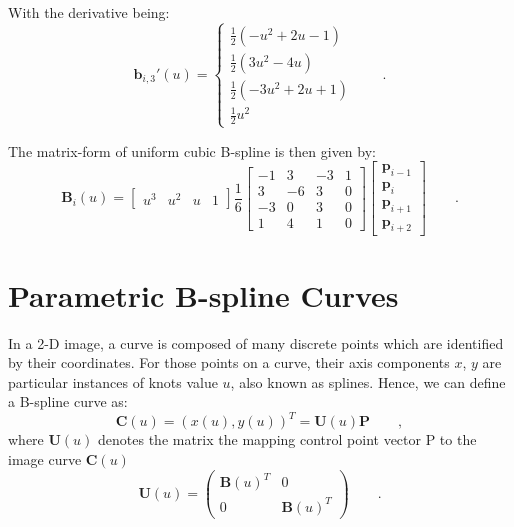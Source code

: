 With the derivative being: 
\begin{equation}
  \label{eq:4.7}
  \mathbf{b}_{i,3}'(u) = \begin{cases} \frac{1}{2}(-u^2+2u-1) \\
    \frac{1}{2}(3u^2 -4u)\\ \frac{1}{2}(-3u^2+2u+1) \\
    \frac{1}{2}u^2
   \end{cases}\qquad .
\end{equation}


The matrix-form of uniform cubic B-spline is then given by:
\begin{equation}
  \label{eq:4.8}
\mathbf{B}_i(u) = \begin{bmatrix} u^3 & u^2 & u & 1 \end{bmatrix} \frac{1}{6} \begin{bmatrix}
-1 &  3 & -3 & 1 \\
 3 & -6 &  3 & 0 \\
-3 &  0 &  3 & 0 \\
 1 &  4 &  1 & 0 \end{bmatrix}
\begin{bmatrix} \mathbf{p}_{i-1} \\ \mathbf{p}_{i} \\ \mathbf{p}_{i+1}
  \\ \mathbf{p}_{i+2} \end{bmatrix}\qquad .
\end{equation}

\section{Parametric B-spline Curves}
\label{sec:pbc}

In a 2-D image, a curve is composed of many discrete points which are
identified by their coordinates. For those points on a curve, their axis
components $x$, $y$ are particular instances of knots value $u$, also known
as splines. Hence, we can define a B-spline curve as:
\begin{equation}
  \label{eq:paramcurve}
  \mathbf{C}(u) = (x(u),y(u))^T = \mathbf{U}(u) \mathbf{P} \qquad ,
\end{equation}
where $\mathbf{U}(u)$ denotes the matrix the mapping control point
vector P to the image
curve $\mathbf{C}(u)$
\begin{equation}
  \label{eq:4.12}
  \mathbf{U}(u) =   \begin{pmatrix}
\mathbf{B}(u)^T & 0 \\
0 &\mathbf{B}(u)^T
  \end{pmatrix}\qquad .
\end{equation}


